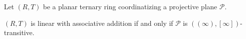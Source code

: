 Let $(R, T)$ be a planar ternary ring coordinatizing a projective plane $\mathcal{P}$.

$(R, T)$ is linear with associative addition if and only if $\mathcal{P}$ is $((\infty), [\infty])$-transitive.

